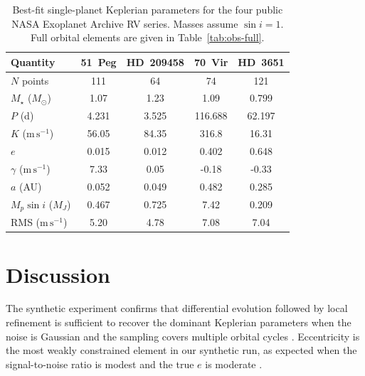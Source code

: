 \documentclass[11pt]{article}
\begin{document}
\begin{table}[H]
\centering
\caption{Best-fit single-planet Keplerian parameters for the four public NASA
Exoplanet Archive RV series. Masses assume $\sin i = 1$. Full orbital elements
are given in Table~\ref{tab:obs-full}.}
\label{tab:obs}
\begin{tabular}{@{}lcccc@{}}
\toprule
Quantity & 51~Peg & HD~209458 & 70~Vir & HD~3651 \\
\midrule
$N$ points & 111 & 64 & 74 & 121 \\
$M_\star$ ($M_\odot$) & 1.07 & 1.23 & 1.09 & 0.799 \\
$P$ (d) & 4.231 & 3.525 & 116.688 & 62.197 \\
$K$ ($\mathrm{m\,s^{-1}}$) & 56.05 & 84.35 & 316.8 & 16.31 \\
$e$ & 0.015 & 0.012 & 0.402 & 0.648 \\
$\gamma$ ($\mathrm{m\,s^{-1}}$) & 7.33 & 0.05 & -0.18 & -0.33 \\
$a$ (AU) & 0.052 & 0.049 & 0.482 & 0.285 \\
$M_p\sin i$ ($M_J$) & 0.467 & 0.725 & 7.42 & 0.209 \\
RMS ($\mathrm{m\,s^{-1}}$) & 5.20 & 4.78 & 7.08 & 7.04 \\
\bottomrule
\end{tabular}
\end{table}


\section{Discussion}

The synthetic experiment confirms that differential evolution followed by
local refinement is sufficient to recover the dominant Keplerian parameters
when the noise is Gaussian and the sampling covers multiple orbital cycles
\citep{storn1997differential,wright2009efficient}. Eccentricity is the most
weakly constrained element in our synthetic run, as expected when the
signal-to-noise ratio is modest and the true $e$ is moderate
\citep{ford2005quantifying}.
\end{document}
